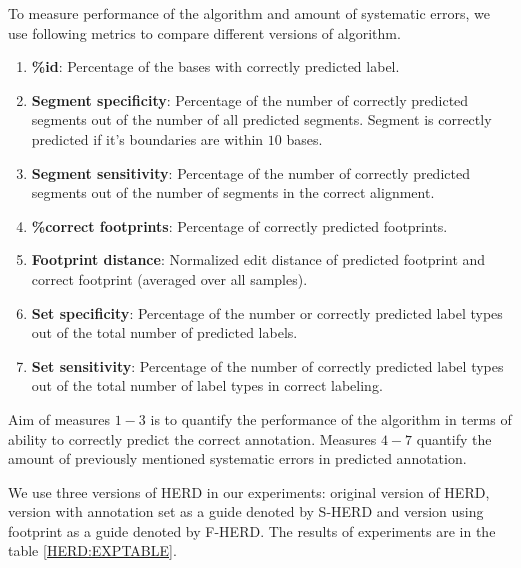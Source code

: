 To measure performance of the algorithm and amount of systematic errors, we use
following metrics to compare different versions of algorithm.
\begin{enumerate}
\item {\bf \%id}: Percentage of the bases with correctly predicted label.

\item {\bf Segment specificity}: Percentage of the number of correctly predicted
segments out of the number of all predicted segments. Segment is correctly
predicted if it's boundaries are within $10$ bases.

\item {\bf Segment sensitivity}: Percentage of the number of correctly predicted
segments out of the number of segments in the correct alignment.

\item {\bf \%correct footprints}: Percentage of correctly predicted footprints.

\item {\bf Footprint distance}: Normalized edit distance of predicted footprint
and correct footprint (averaged over all samples).

\item {\bf Set specificity}: Percentage of the number or correctly predicted label
types out of the total number of predicted labels.

\item {\bf Set sensitivity}: Percentage of the number of correctly predicted label
types out of the total number of label types in correct labeling.

\end{enumerate} 
Aim of measures $1-3$ is to quantify the performance of the algorithm in terms
of ability to correctly predict the correct annotation. Measures $4-7$ quantify
the amount of previously mentioned systematic errors in predicted annotation.

We use three versions of HERD in our experiments: original version of HERD,
version with annotation set as a guide denoted by S-HERD and version using
footprint as a guide denoted by F-HERD. The results of experiments are in the
table \ref{HERD:EXPTABLE}. 

